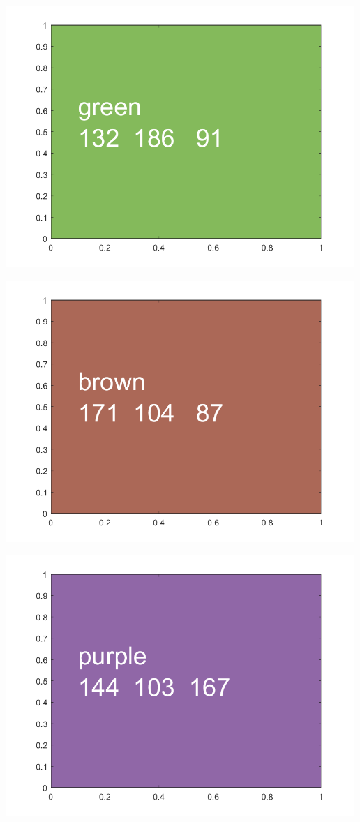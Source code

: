 \documentclass[
]{book}
\begin{document}
\includegraphics[width=5.20833in,height=\textheight]{img/fs_color_images/figure_9.png}

\includegraphics[width=5.20833in,height=\textheight]{img/fs_color_images/figure_10.png}

\includegraphics[width=5.20833in,height=\textheight]{img/fs_color_images/figure_11.png}
\end{document}
